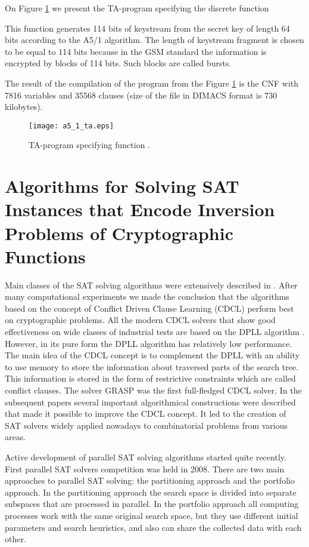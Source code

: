 \documentclass[runningheads,a4paper]{llncs}
\begin{document}
On Figure \ref{a5_1_ta_program} we present the TA-program specifying the discrete function

This function generates 114 bits of keystream from the secret key of length 64 bits according to the A5/1 algorithm. The length of keystream fragment is chosen to be equal to 114 bits because in the GSM standard the information is encrypted by blocks of 114 bits. Such blocks are called bursts. 

The result of the compilation of the program from the Figure \ref{a5_1_ta_program} is the CNF with 7816 variables and 35568 clauses (size of the file in DIMACS format is 730 kilobytes).

\begin{figure}[ht]
	\centering
		\texttt{[image: a5\_1\_ta.eps]}
	\caption{TA-program specifying function .}
	\label{a5_1_ta_program}
\end{figure}

\section{Algorithms for Solving SAT Instances that Encode Inversion Problems of Cryptographic Functions}

Main classes of the SAT solving algorithms were extensively described in \cite{DBLP:series/faia/2009-185}. After many computational experiments we made the conclusion that the algorithms based on the concept of Conflict Driven Clause Learning (CDCL) \cite{DBLP:series/faia/SilvaLM09} perform best on cryptographic problems. All the modern CDCL solvers that show good effectiveness on wide classes of industrial tests are based on the DPLL algorithm \cite{Davis:1962:MPT:368273.368557}. However, in its pure form the DPLL algorithm has relatively low performance. The main idea of the CDCL concept is to complement the DPLL with an ability to use memory to store the information about traversed parts of the search tree. This information is stored in the form of restrictive constraints which are called conflict clauses. The solver GRASP \cite{DBLP:journals/tc/Marques-SilvaS99} was the first full-fledged CDCL solver. In the subsequent papers \cite{DBLP:conf/iccad/ZhangMMM01,DBLP:conf/dac/MoskewiczMZZM01} several important algorithmical constructions were described that made it possible to improve the CDCL concept. It led to the creation of SAT solvers widely applied nowadays to combinatorial problems from various areas. 

Active development of parallel SAT solving algorithms started quite recently. First parallel SAT solvers competition was held in 2008. There are two main approaches to parallel SAT solving: the partitioning approach and the portfolio approach. In the partitioning approach the search space is divided into separate subspaces that are processed in parallel. In the portfolio approach all computing processes work with the same original search space, but they use different initial parameters and search heuristics, and also can share the collected data with each other.
\end{document}
